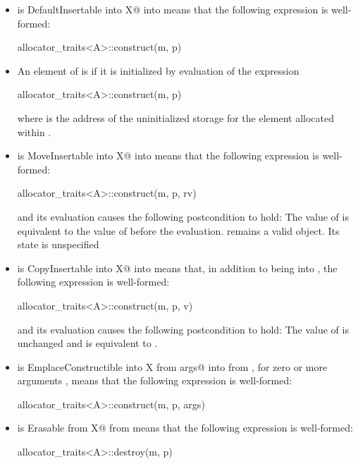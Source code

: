 \begin{itemize}
\item
{} is 
{DefaultInsertable into X@ into }
means that the following expression is well-formed:
\begin{codeblock}
allocator_traits<A>::construct(m, p)
\end{codeblock}

\item
An element of  is  if it is initialized
by evaluation of the expression
\begin{codeblock}
allocator_traits<A>::construct(m, p)
\end{codeblock}
where  is the address of the uninitialized storage for the element
allocated within .
	
\item
{} is 
{MoveInsertable into X@ into }
means that the following expression
is well-formed:
\begin{codeblock}
allocator_traits<A>::construct(m, p, rv)
\end{codeblock}
and its evaluation causes the following postcondition to hold: The value
of  is equivalent to the value of  before the evaluation.
\enternote {} remains a valid object. Its state is unspecified \exitnote

\item
{} is 
{CopyInsertable into X@ into }
means that, in addition to  being  into
, the following expression is well-formed:
\begin{codeblock}
allocator_traits<A>::construct(m, p, v)
\end{codeblock}
and its evaluation causes the following postcondition to hold:
The value of  is unchanged and is equivalent to .

\item
{} is
{EmplaceConstructible into X from args@ into  from },
for zero
or more arguments , means that the following expression is well-formed:
\begin{codeblock}
allocator_traits<A>::construct(m, p, args)
\end{codeblock}

\item
{} is
{Erasable from X@ from }
means that the following expression is well-formed:
\begin{codeblock}
allocator_traits<A>::destroy(m, p)
\end{codeblock}
\end{itemize}

